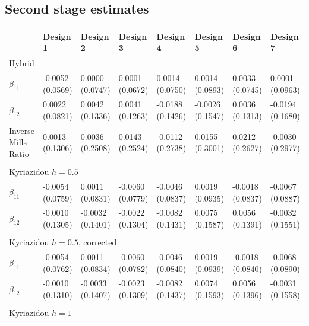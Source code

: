 \subsection{Second stage estimates}
\begin{table}
    \begin{adjustwidth}{-.5in}{-.5in}
    \small
    \centering
    \begin{tabular}{p{3cm}p{1.3cm}p{1.3cm}p{1.3cm}p{1.3cm}p{1.3cm}p{1.3cm}p{1.3cm}}
      \hline
       \quad & Design 1 & Design 2 & Design 3 & Design 4 & Design 5 & Design 6 & Design 7  \\
       \hline
       \multicolumn{8}{l}{Hybrid} \\
       \hline
        $\beta_{11}$  & -0.0052 (0.0569) & 0.0000 (0.0747) & 0.0001 (0.0672) & 0.0014 (0.0750) & 0.0014 (0.0893) & 0.0033 (0.0745) & 0.0001 (0.0963) \\
        $\beta_{12}$  & 0.0022 (0.0821) & 0.0042 (0.1336) & 0.0041 (0.1263) & -0.0188 (0.1426) & -0.0026 (0.1547) & 0.0036 (0.1313) & -0.0194 (0.1680)\\
        Inverse Mills-Ratio  &  0.0013 (0.1306) & 0.0036 (0.2508) & 0.0143 (0.2524) & -0.0112 (0.2738)  & 0.0155 (0.3001) & 0.0212 (0.2627) & -0.0030
    (0.2977)\\
         & & & & & & & \\
        \hline
        \multicolumn{8}{l}{Kyriazidou $h=0.5$} \\
       \hline
        $\beta_{11}$  & -0.0054 (0.0759) & 0.0011 (0.0831) & -0.0060 (0.0779) & -0.0046 (0.0837) & 0.0019 (0.0935) & -0.0018 (0.0837) & -0.0067 (0.0887)\\
        $\beta_{12}$  & -0.0010 (0.1305) & -0.0032 (0.1401) & -0.0022 (0.1304) & -0.0082 (0.1431) & 0.0075 (0.1587) &  0.0056 (0.1391) & -0.0032 (0.1551) \\
         & & & & & & & \\
        \hline
        \multicolumn{8}{l}{Kyriazidou $h=0.5$, corrected} \\
       \hline
        $\beta_{11}$  & -0.0054 (0.0762) & 0.0011 (0.0834) & -0.0060 (0.0782) &  -0.0046 (0.0840) & 0.0019 (0.0939) & -0.0018 (0.0840) & -0.0068 (0.0890) \\
        $\beta_{12}$  & -0.0010 (0.1310) & -0.0033 (0.1407)  & -0.0023 (0.1309) & -0.0082 (0.1437) & 0.0074 (0.1593) & 0.0056 (0.1396) & -0.0031 (0.1558) \\
         & & & & & & & \\
        \hline
        \multicolumn{8}{l}{Kyriazidou $h=1$} \\

\end{tabular}
\end{adjustwidth}
\end{table}

